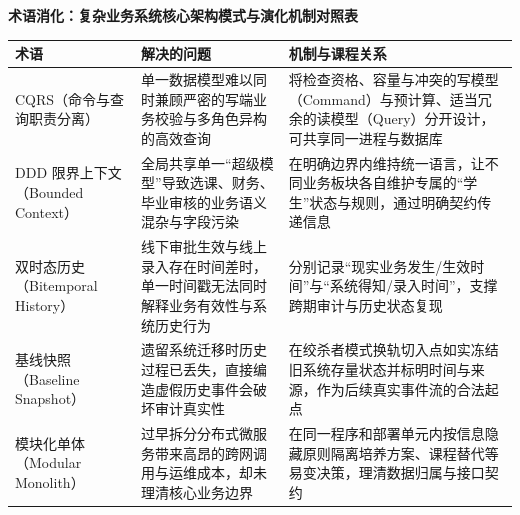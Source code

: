 \documentclass[UTF8,a4paper,11pt,fontset=fandol]{ctexart}
\begin{document}
\par{}\textbf{术语消化：复杂业务系统核心架构模式与演化机制对照表}

\begin{center}\small\begin{tabularx}{\linewidth}{YYY}

\toprule

术语 & 解决的问题 & 机制与课程关系\\\midrule

CQRS（命令与查询职责分离） & 单一数据模型难以同时兼顾严密的写端业务校验与多角色异构的高效查询 & 将检查资格、容量与冲突的写模型（Command）与预计算、适当冗余的读模型（Query）分开设计，可共享同一进程与数据库\\[3pt]

DDD 限界上下文（Bounded Context） & 全局共享单一“超级模型”导致选课、财务、毕业审核的业务语义混杂与字段污染 & 在明确边界内维持统一语言，让不同业务板块各自维护专属的“学生”状态与规则，通过明确契约传递信息\\[3pt]

双时态历史（Bitemporal History） & 线下审批生效与线上录入存在时间差时，单一时间戳无法同时解释业务有效性与系统历史行为 & 分别记录“现实业务发生/生效时间”与“系统得知/录入时间”，支撑跨期审计与历史状态复现\\[3pt]

基线快照（Baseline Snapshot） & 遗留系统迁移时历史过程已丢失，直接编造虚假历史事件会破坏审计真实性 & 在绞杀者模式换轨切入点如实冻结旧系统存量状态并标明时间与来源，作为后续真实事件流的合法起点\\[3pt]

模块化单体（Modular Monolith） & 过早拆分分布式微服务带来高昂的跨网调用与运维成本，却未理清核心业务边界 & 在同一程序和部署单元内按信息隐藏原则隔离培养方案、课程替代等易变决策，理清数据归属与接口契约\\[3pt]

\bottomrule\end{tabularx}\end{center}
\end{document}
